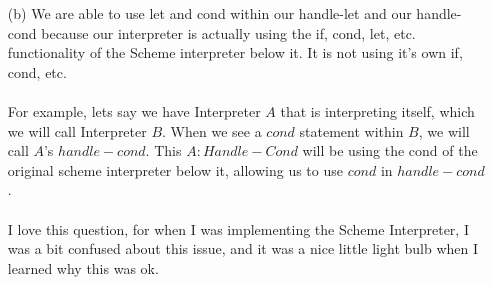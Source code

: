\documentclass[11pt]{article}
\newenvironment{code}{\begin{tabbing}
12345\=12345\=12345\=12345\=12345\=12345\=12345\=12345\= \kill }
{\end{tabbing}}
\begin{document}
\begin{enumerate}
\begin{enumerate}
\begin{enumerate}
\begin{code}
$(define\ (handle-longest-helper\ RemainingER\ LongestER\ env)$\\
\> $(cond\ ((null?\ RemainingER)\ (my-eval\ (cadr\ LongestEr)\ env))\ $\\
\> \> $(else\ $\\
\> \> \> $(cond\ ((>\ (length\ (my-eval\ (caar\ RemainingER)\ env))$\\
\> \> \> \> \>$(length\ (my-eval\ (car\ LongestER)\ env))) $\\
\> \> \> \> \> \> $(handle-longest-helper\ (cdr\ RemainingER)$\\
\> \> \> \> \> \> \> \>$ (car\ RemainingER)\ env))$\\
\> \> \> \>$(else\ (handle-longest-helper\ (cdr\ RemainingER)\ LongestER\ env)))$\\
\> \> \> \> $)))$ \\
\end{code}
\end{enumerate}
\item[(b)] We are able to use let and cond within our handle-let and our handle-cond because our interpreter is actually using the if, cond, let, etc. functionality of the Scheme interpreter below it.  It is not using it's own if, cond, etc.  \\ \\
For example, lets say we have Interpreter $A$ that is interpreting itself, which we will call Interpreter $B$.  When we see a $cond$ statement within $B$, we will call $A$'s $handle-cond$.  This $A: Handle-Cond$ will be using the cond of the original scheme interpreter below it, allowing us to use $cond$ in $handle-cond$.\\ \\
I love this question, for when I was implementing the Scheme Interpreter, I was a bit confused about this issue, and it was a nice little light bulb when I learned why this was ok.
\\ \\
\end{enumerate}


\end{enumerate}
\end{document}
